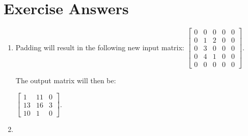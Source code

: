 \newpage
\section{Exercise Answers}

\begin{enumerate}
\item \noindent 

Padding will result in the following new input matrix:
$\left[\begin{smallmatrix}
0 & 0 & 0 & 0 & 0 \\
0 & 1 & 2 & 0 & 0\\
0 & 3 & 0 & 0 & 0\\
0 & 4 & 1 & 0 & 0 \\
0 & 0 & 0 & 0 & 0
\end{smallmatrix}\right]$.

The output matrix will then be:

$\left[\begin{smallmatrix}
1 & 11 & 0\\
13 & 16 & 3\\
10 & 1 & 0
\end{smallmatrix}\right]$. 





\item \noindent


\end{enumerate}
